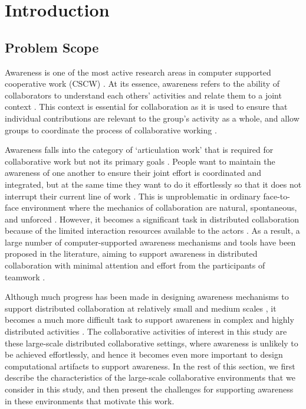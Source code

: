 \graphicspath{{Figures/}}

\chapter{Introduction} 
\label{chapter1:introduction}

\section{Problem Scope}
\label{sec:problem_scope}
Awareness is one of the most active research areas in computer supported cooperative work (CSCW) \cite{dourish1992awareness,schmidt2002a,rittenbruch2009a}. At its essence, awareness refers to the ability of collaborators to understand each others' activities and relate them to a joint context \cite{rittenbruch2009a}. This context is essential for collaboration as it is used to ensure that individual contributions are relevant to the group’s activity as a whole, and allow groups to coordinate the process of collaborative working \cite{dourish1992awareness}. 

Awareness falls into the category of `articulation work' that is required for collaborative work but not its primary goals \cite{schmidt1992taking}. People want to maintain the awareness of one another to ensure their joint effort is coordinated and integrated, but at the same time they want to do it effortlessly so that it does not interrupt their current line of work \cite{fussell1998coordination}. This is unproblematic in ordinary face-to-face environment where the mechanics of collaboration are natural, spontaneous, and unforced \cite{Gutwin2002}. However, it becomes a significant task in distributed collaboration because of the limited interaction resources available to the actors \cite{carroll2003a}. As a result, a large number of computer-supported awareness mechanisms and tools have been proposed in the literature, aiming to support awareness in distributed collaboration with minimal attention and effort from the participants of teamwork \cite{rittenbruch2009a,markopoulos2009design}.

Although much progress has been made in designing awareness mechanisms to support distributed collaboration at relatively small and medium scales \cite{antunes2010a}, it becomes a much more difficult task to support awareness in complex and highly distributed activities \cite{cabitza2009promoting}. The collaborative activities of interest in this study are these large-scale distributed collaborative settings, where awareness is unlikely to be achieved effortlessly, and hence it becomes even more important to design computational artifacts to support awareness. In the rest of this section, we first describe the characteristics of the large-scale collaborative environments that we consider in this study, and then present the challenges for supporting awareness in these environments that motivate this work.

